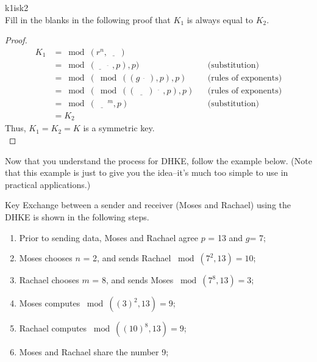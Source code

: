 \begin{exercise}{k1isk2}\\
Fill in the blanks in the following proof that  $K_1$ is always equal to  $K_2$.\\
  	\begin{proof} 
		\begin{align*} 
		K_1 &=   \bmod (r^n , \underline{~~~~~~}) 
           	\\&=  \bmod ( \underline{~~~~}^{\underline{~~~~~~}} , p) , p )&& \text{(substitution)}	%
		\\&= \bmod ( \bmod ((g^{\underline{~~~~~~}}) , p) , p )&&  \text{(rules of exponents)}	%
           	\\&= \bmod ( \bmod ((\underline{~~~~~~})^{\underline{~~~~~~}} , p) , p )  &&\text{(rules of exponents)}	%
           	\\&= \bmod (\underline{~~~~~~}^m , p )&&\text{(substitution)}   	%
		\\&= K_2
		\end{align*} 
   	Thus, $K_1 = K_2 = K$ is a symmetric key.\\

  	\end{proof}
\end{exercise}

Now that you understand the process for DHKE, follow the example below.  (Note that this example is just to give you the idea--it's much too simple to use in practical applications.)

 \begin{eg} Key Exchange between a sender and receiver (Moses and Rachael) using the DHKE is shown in the following steps.
\begin{enumerate}[Step 1.]
\item Prior to sending data, Moses and Rachael agree $p$ = 13 and $g$= 7; 
\item Moses chooses $n$ = 2, and sends Rachael $\bmod (7^2 , 13) = 10$;
\item Rachael chooses $m$ = 8, and sends Moses $\bmod (7^8  , 13) = 3 $;
\item Moses computes $\bmod ((3)^2 , 13 ) = 9$;
\item Rachael computes $\bmod ((10)^8 , 13 ) = 9$;
\item Moses and Rachael share the number 9;
\end{enumerate}
\end{eg}

